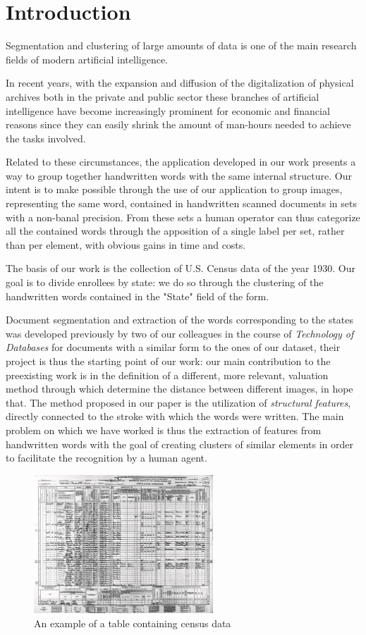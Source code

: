 \section{Introduction}
Segmentation and clustering of large amounts of data is one of the main research fields of modern artificial intelligence.

In recent years, with the expansion and diffusion of the digitalization of physical archives both in the private and public sector these branches of artificial intelligence have become increasingly prominent for economic and financial reasons since they can easily shrink the amount of man-hours needed to achieve the tasks involved. 

Related to these circumstances, the application developed in our work presents a way to group together handwritten words with the same internal structure.
Our intent is to make possible through the use of our application to group images, representing the same word, contained in handwritten scanned documents in sets with a non-banal precision.
From these sets a human operator can thus categorize all the contained words through the apposition of a single label per set, rather than per element, with obvious gains in time and costs.

  
The basis of our work is the collection of U.S. Census data of the year 1930.
Our goal is to divide enrollees by state: we do so through the clustering of the handwritten words contained in the "State" field of the form.

Document segmentation and extraction of the words corresponding to the states was developed previously by two of our colleagues in the course of \emph{Technology of Databases} for documents with a similar form to the ones of our dataset, their project is thus the starting point of our work: our main contribution to the preexisting work is in the definition of a different, more relevant, valuation method through which determine the distance between different images, in hope that.
The method proposed in our paper is the utilization of \textit{structural features}, directly connected to the stroke with which the words were written. 
The main problem on which we have worked is thus the extraction of features from handwritten words with the goal of creating clusters of similar elements in order to facilitate the recognition by a human agent.

\begin{figure}[!ht]
\centering
\includegraphics[width=0.6\textwidth]{images/img1.jpg}
\caption{An example of a table containing census data}
\end{figure}